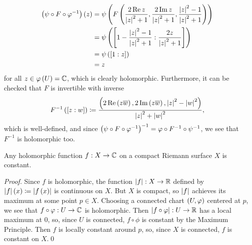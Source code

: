 \documentclass[../Moduli_Spaces_of_Riemann_Surfaces.tex]{subfiles}
\begin{document}
\begin{example}
\begin{equation*}
            \begin{aligned}
                \left(\psi\circ F\circ\varphi^{-1}\right)\left(z\right)&=\psi\left(F\left(\frac{2\operatorname{Re} z}{\left|z\right|^2+1},\frac{2\operatorname{Im} z}{\left|z\right|^2+1},\frac{\left|z\right|^2-1}{\left|z\right|^2+1}\right)\right) \\
                                                      &=\psi\left(\left[1-\frac{\left|z\right|^2-1}{\left|z\right|^2+1}:\frac{2z}{\left|z\right|^2+1}\right]\right) \\
                                                      &=\psi\left(\left[1:z\right]\right) \\
                                                      &=z
            \end{aligned}
        \end{equation*}
        for all $z\in\varphi\left(U\right)=\mathbb{C}$, which is clearly holomorphic. Furthermore, it can be checked that $F$ is invertible with inverse\side{}
        \begin{equation*}
            F^{-1}\left(\left[z:w\right]\right)\coloneqq\frac{\left(2\operatorname{Re}\left(z\overline{w}\right),2\operatorname{Im}\left(z\overline{w}\right),\left|z\right|^2-\left|w\right|^2\right)}{\left|z\right|^2+\left|w\right|^2},
        \end{equation*}
        which is well-defined, and since $\left(\psi\circ F\circ\varphi^{-1}\right)^{-1}=\varphi\circ F^{-1}\circ\psi^{-1}$, we see that $F^{-1}$ is holomorphic too.\exqed
    \end{example}
    \begin{proposition}\label{1.2:prp:holomorphic_compact_constant}
        Any holomorphic function $f:X\to\mathbb{C}$ on a compact Riemann surface $X$ is constant.
    \end{proposition}
    \begin{proof}
        Since $f$ is holomorphic, the function $\left|f\right|:X\to\mathbb{R}$ defined by $\left|f\right|\left(x\right)\coloneqq\left|f\left(x\right)\right|$ is continuous on $X$. But $X$ is compact, so $\left|f\right|$ achieves its maximum at some point $p\in X$. Choosing a connected chart $\left(U,\varphi\right)$ centered at $p$, we see that $f\circ\varphi:U\to\mathbb{C}$ is holomorphic. Then $\left|f\circ\varphi\right|:U\to\mathbb{R}$ has a local maximum at $0$, so, since $U$ is connected, $f\circ\phi$ is constant by the Maximum Principle. Then $f$ is locally constant around $p$, so, since $X$ is connected, $f$ is constant on $X$.\qed
    \end{proof}
\end{document}
